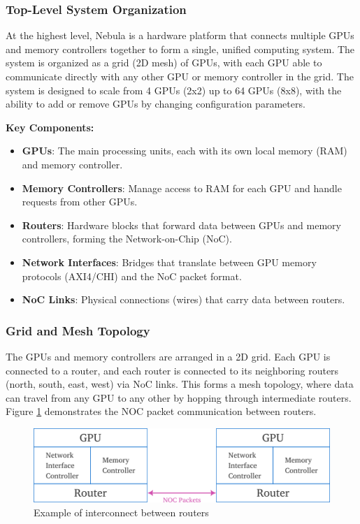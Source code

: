 \documentclass[11pt,a4paper]{article}
\begin{document}
\subsubsection{Top-Level System Organization}
At the highest level, Nebula is a hardware platform that connects multiple GPUs and memory controllers together to form a single, unified computing system. The system is organized as a grid (2D mesh) of GPUs, with each GPU able to communicate directly with any other GPU or memory controller in the grid. The system is designed to scale from 4 GPUs (2x2) up to 64 GPUs (8x8), with the ability to add or remove GPUs by changing configuration parameters.

\textbf{Key Components:}
\begin{itemize}
    \item \textbf{GPUs}: The main processing units, each with its own local memory (RAM) and memory controller.
    \item \textbf{Memory Controllers}: Manage access to RAM for each GPU and handle requests from other GPUs.
    \item \textbf{Routers}: Hardware blocks that forward data between GPUs and memory controllers, forming the Network-on-Chip (NoC).
    \item \textbf{Network Interfaces}: Bridges that translate between GPU memory protocols (AXI4/CHI) and the NoC packet format.
    \item \textbf{NoC Links}: Physical connections (wires) that carry data between routers.
\end{itemize}

\subsubsection{Grid and Mesh Topology}
The GPUs and memory controllers are arranged in a 2D grid. Each GPU is connected to a router, and each router is connected to its neighboring routers (north, south, east, west) via NoC links. This forms a mesh topology, where data can travel from any GPU to any other by hopping through intermediate routers. Figure \ref{fig:router topology} demonstrates the NOC packet communication between routers. 

\begin{figure}[h!]
	\centering
	\includegraphics[width=0.75\linewidth]{images/inter-router-comms.png}
	\caption{Example of interconnect between routers}
	\label{fig:router topology}
\end{figure}
\end{document}
